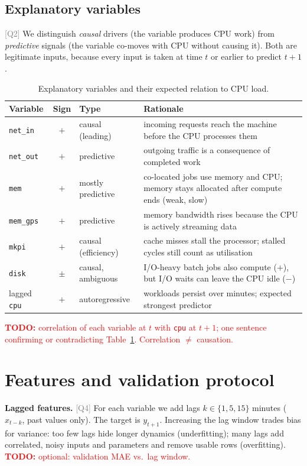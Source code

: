 \documentclass[10pt,a4paper]{article}
\newcommand{\todo}[1]{\textcolor{red}{\textbf{TODO:} #1}}
\newcommand{\q}[1]{\textcolor{gray}{\small[#1]}}
\newcommand{\code}[1]{\texttt{#1}}
\begin{document}
\subsection*{Explanatory variables}
\q{Q2}
We distinguish \emph{causal} drivers (the variable produces CPU work) from \emph{predictive}
signals (the variable co-moves with CPU without causing it). Both are legitimate inputs, because
every input is taken at time $t$ or earlier to predict $t+1$.

\begin{table}[ht]\centering\small
\caption{Explanatory variables and their expected relation to CPU load.}\label{tab:vars}
\begin{tabularx}{\linewidth}{l c l X}
\toprule
Variable & Sign & Type & Rationale \\
\midrule
\code{net\_in}   & $+$   & causal (leading)    & incoming requests reach the machine before the CPU processes them \\
\code{net\_out}  & $+$   & predictive          & outgoing traffic is a consequence of completed work \\
\code{mem}       & $+$   & mostly predictive   & co-located jobs use memory and CPU; memory stays allocated after compute ends (weak, slow) \\
\code{mem\_gps}  & $+$   & predictive          & memory bandwidth rises because the CPU is actively streaming data \\
\code{mkpi}      & $+$   & causal (efficiency) & cache misses stall the processor; stalled cycles still count as utilisation \\
\code{disk}      & $\pm$ & causal, ambiguous   & I/O-heavy batch jobs also compute ($+$), but I/O waits can leave the CPU idle ($-$) \\
lagged \code{cpu}& $+$   & autoregressive      & workloads persist over minutes; expected strongest predictor \\
\bottomrule
\end{tabularx}
\end{table}
\todo{correlation of each variable at $t$ with \code{cpu} at $t+1$; one sentence confirming or
contradicting Table~\ref{tab:vars}. Correlation $\neq$ causation.}

\section{Features and validation protocol}\label{sec:protocol}
\textbf{Lagged features.} \q{Q4}
For each variable we add lags $k \in \{1, 5, 15\}$ minutes ($x_{t-k}$, past values only). The
target is $y_{t+1}$. Increasing the lag window trades bias for variance: too few lags hide
longer dynamics (underfitting); many lags add correlated, noisy inputs and parameters and
remove usable rows (overfitting). \todo{optional: validation MAE vs.\ lag window.}
\end{document}
